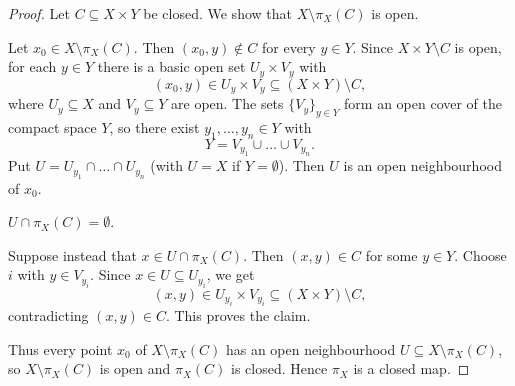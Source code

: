
\begin{proof}
Let $C\subseteq X\times Y$ be closed. We show that $X\setminus\pi_X(C)$ is open.

Let $x_0\in X\setminus\pi_X(C)$. Then $(x_0,y)\notin C$ for every $y\in Y$. Since
$X\times Y\setminus C$ is open, for each $y\in Y$ there is a basic open set $U_y\times V_y$ with
\[ (x_0,y)\in U_y\times V_y\subseteq(X\times Y)\setminus C, \]
where $U_y\subseteq X$ and $V_y\subseteq Y$ are open. The sets $\{V_y\}_{y\in Y}$ form an open
cover of the compact space $Y$, so there exist $y_1,\dots,y_n\in Y$ with
\[ Y=V_{y_1}\cup\dots\cup V_{y_n}. \]
Put $U=U_{y_1}\cap\dots\cap U_{y_n}$ (with $U=X$ if $Y=\emptyset$). Then $U$ is an open
neighbourhood of $x_0$.

\begin{claim}
$U\cap\pi_X(C)=\emptyset$.
\end{claim}
Suppose instead that $x\in U\cap\pi_X(C)$. Then $(x,y)\in C$ for some $y\in Y$. Choose $i$ with
$y\in V_{y_i}$. Since $x\in U\subseteq U_{y_i}$, we get
\[ (x,y)\in U_{y_i}\times V_{y_i}\subseteq(X\times Y)\setminus C, \]
contradicting $(x,y)\in C$. This proves the claim.

Thus every point $x_0$ of $X\setminus\pi_X(C)$ has an open neighbourhood
$U\subseteq X\setminus\pi_X(C)$, so $X\setminus\pi_X(C)$ is open and $\pi_X(C)$ is closed. Hence
$\pi_X$ is a closed map.
\end{proof}
